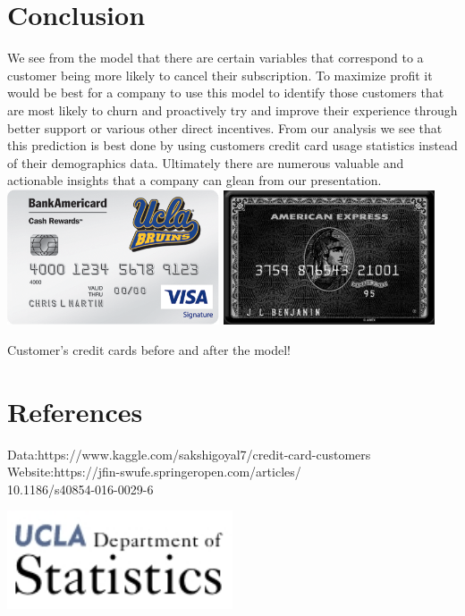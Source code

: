 \documentclass[a0paper,fleqn]{betterposter}
\begin{document}
{\section{Conclusion}
We see from the model that there are certain variables that correspond to a customer being more likely to cancel their subscription. To maximize profit it would be best for a company to use this model to identify those customers that are most likely to churn and proactively try and improve their experience through better support or various other direct incentives. From our analysis we see that this prediction is best done by using customers credit card usage statistics instead of their demographics data. Ultimately there are numerous valuable and actionable insights that a company can glean from our presentation.\\

\includegraphics[width=0.47\textwidth]{img/UCLA-Credit-Card.png} \hspace{1.3cm}
\includegraphics[width=0.47\textwidth]{img/black-card.jpg}
\begin{center}
    \caption{Customer's credit cards before and after the model!}
\end{center}



\section{References}
Data:\:https://www.kaggle.com/sakshigoyal7/credit-card-customers\\
Website:\:https://jfin-swufe.springeropen.com/articles/\\10.1186/s40854-016-0029-6



\vfill
\begin{center}
    \includegraphics[width=0.5\textwidth]{img/DeptLogo.png}\\
\end{center}}
\end{document}
